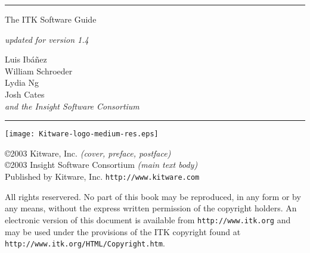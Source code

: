 
\begin{minipage}[t][3cm][b]{\textwidth}
\rule{14cm}{1pt}
\end{minipage}


\begin{minipage}[t][3cm][b]{\textwidth}
\Huge
The ITK Software Guide\\
\normalsize
\par
\emph{updated for version 1.4}\\
\end{minipage}

\hfill
\begin{minipage}[t][6cm][b]{0.6\textwidth}
\Large
\renewcommand{\baselinestretch}{1.5}
Luis Ib\'{a}\~{n}ez\\
William Schroeder\\
Lydia Ng\\
Josh Cates\\
\emph{and the Insight Software Consortium}
\normalsize
\end{minipage}


\begin{minipage}[t][2cm][b]{\textwidth}
\rule{14cm}{1pt}
\end{minipage}

\newpage

\begin{minipage}[t][5cm][b]{\textwidth}
\begin{center}
\texttt{[image: Kitware-logo-medium-res.eps]}
\end{center}
\par
\begin{center}
\large
\copyright 2003 Kitware, Inc. \emph{(cover, preface, postface)}\\
\copyright 2003 Insight Software Consortium \emph{(main text body)}\\
Published by Kitware, Inc. \texttt{http://www.kitware.com}
\normalsize
\end{center}
\end{minipage}


\begin{minipage}[t][2.5cm][b]{\textwidth}
\begin{center}
All rights reservered. No part of this book may be reproduced, in any form 
or by any means, without the express written permission of the copyright
holders. An electronic version of this document is available from
\texttt{http://www.itk.org} and may be used under the provisions of the
ITK copyright found at \texttt{http://www.itk.org/HTML/Copyright.htm}.
\end{center}
\end{minipage}


